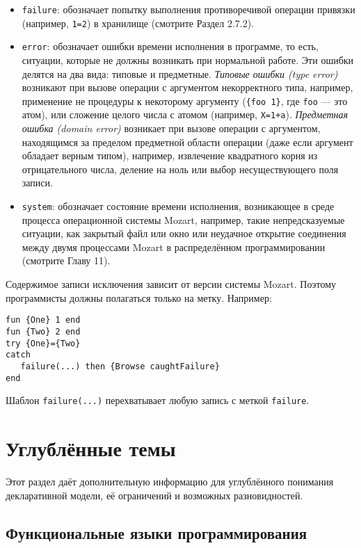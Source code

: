 \begin{itemize}
\item{\lstinline!failure!: обозначает попытку выполнения противоречивой операции привязки (например, \lstinline!1=2!) в хранилище (смотрите Раздел 2.7.2).}

\item{\lstinline!error!: обозначает ошибки времени исполнения в программе, то есть, ситуации, которые не должны возникать при нормальной работе. Эти ошибки делятся на два вида: типовые и предметные. \emph{Типовые ошибки (type error)} возникают при вызове операции с аргументом некорректного типа, например, применение не процедуры к некоторому аргументу (\lstinline!{foo 1}!, где \lstinline!foo! --- это атом), или сложение целого числа с атомом (например, \lstinline!X=1+a!). \emph{Предметная ошибка (domain error)} возникает при вызове операции с аргументом, находящимся за пределом предметной области операции (даже если аргумент обладает верным типом), например, извлечение квадратного корня из отрицательного числа, деление на ноль или выбор несуществующего поля записи.}

\item{\lstinline!system!: обозначает состояние времени исполнения, возникающее в среде процесса операционной системы Mozart, например, такие непредсказуемые ситуации, как закрытый файл или окно или неудачное открытие соединения между двумя процессами Mozart в распределённом программировании (смотрите Главу 11).}
\end{itemize}

Содержимое записи исключения зависит от версии системы Mozart. Поэтому программисты должны полагаться только на метку. Например:

\begin{lstlisting}
fun {One} 1 end
fun {Two} 2 end
try {One}={Two}
catch
   failure(...) then {Browse caughtFailure}
end
\end{lstlisting}

Шаблон \lstinline!failure(...)! перехватывает любую запись с меткой \lstinline!failure!.

\section{Углублённые темы}

Этот раздел даёт дополнительную информацию для углублённого понимания декларативной модели, её ограничений и возможных разновидностей.

\subsection{Функциональные языки программирования}

